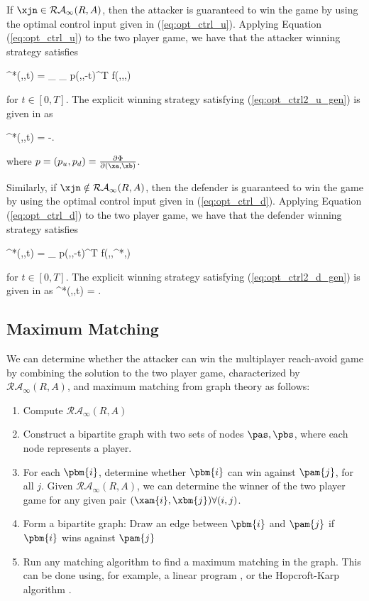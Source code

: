 If $\xjn\in\mathcal{RA}_\infty(R,A)$, then the attacker is guaranteed to win the game by using the optimal control input given in (\ref{eq:opt_ctrl_u}). Applying Equation (\ref{eq:opt_ctrl_u}) to the two player game, we have that the attacker winning strategy satisfies 

\bq \label{eq:opt_ctrl2_u_gen}
  \ca^*(\xa,\xb,t) = \arg \min_{\ca \in {}} \max_{\cb \in {}} p(\xa,\xb,-t)^T f(\xa,\xb,\ca,\cb) 
\eq

\noindent for $t \in [0,T]$. The explicit winning strategy satisfying (\ref{eq:opt_ctrl2_u_gen}) is given in \cite{Huang2011} as

\bq \label{eq:opt_ctrl2_a}
\ca^*(\xa,\xb,t) = -\vela {}.
\eq

\noindent where $p = (p_u,p_d) = \frac{\partial \Phi}{\partial (\xa,\xb)}$.  

Similarly, if $\xjn\notin\mathcal{RA}_\infty(R,A)$, then the defender is guaranteed to win the game by using the optimal control input given in (\ref{eq:opt_ctrl_d}). Applying Equation (\ref{eq:opt_ctrl_d}) to the two player game, we have that the defender winning strategy satisfies 

\bq \label{eq:opt_ctrl2_d_gen}
  \cb^*(\xa,\xb,t) = \arg \max_{\cb \in {}} p(\xa,\xb,-t)^T f(\xa,\xb,\ca^*,\cb)
\eq

\noindent for $t \in [0,T]$. The explicit winning strategy satisfying (\ref{eq:opt_ctrl2_d_gen}) is given in \cite{Huang2011} as
\bq \label{eq:opt_ctrl2_d}
\cb^*(\xa,\xb,t) = \velb {}.
\eq

\subsection{Maximum Matching}
\label{subsec:max_match}
We can determine whether the attacker can win the multiplayer reach-avoid game by combining the solution to the two player game, characterized by $\mathcal{RA}_\infty(R,A)$, and maximum matching \cite{Schrjiver2004, Karpinski1998} from graph theory as follows:

\begin{enumerate}
\item Compute $\mathcal{RA}_\infty(R,A)$
\item Construct a bipartite graph with two sets of nodes $\pas,\pbs$, where each node represents a player.
\item For each $\pbm{i}$, determine whether $\pbm{i}$ can win against $\pam{j}$, for all $j$. Given $\mathcal{RA}_\infty(R,A)$, we can determine the winner of the two player game for any given pair $(\xam{i},\xbm{j}) \forall (i,j)$.
\item Form a bipartite graph: Draw an edge between $\pbm{i}$ and $\pam{j}$ if $\pbm{i}$ wins against $\pam{j}$
\item Run any matching algorithm to find a maximum matching in the graph. This can be done using, for example, a linear program \cite{Schrjiver2004}, or the Hopcroft-Karp algorithm \cite{Karpinski1998}.
\end{enumerate}

